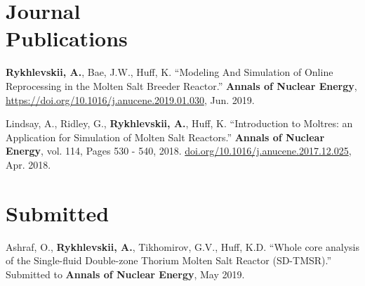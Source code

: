 \documentclass[margin,line]{resume}
\newcommand{\Cyclus}{\textsc{Cyclus}\xspace}%
\begin{document}
\begin{resume}
    \section{\mysidestyle Journal\\Publications}
      \begin{bibenum}
	    
	    
	    \item \textbf{Rykhlevskii, A.}, Bae, J.W., Huff, K. ``Modeling And Simulation of Online Reprocessing in the Molten Salt Breeder Reactor.'' \textbf{Annals of Nuclear Energy}, 
               \url{https://doi.org/10.1016/j.anucene.2019.01.030}, 
               Jun. 2019.
       \item Lindsay, A., Ridley, G., \textbf{Rykhlevskii, A.}, Huff, K. ``Introduction to 
               Moltres: an Application for Simulation of Molten Salt 
               Reactors.''  \textbf{Annals of Nuclear Energy}, vol. 114, Pages 530 - 540, 2018. \url{doi.org/10.1016/j.anucene.2017.12.025}, Apr. 2018.
      \end{bibenum}
\vspace{2mm} %
	\section{\mysidestyle Submitted}
	\begin{bibenum}
		\item Ashraf, O., \textbf{Rykhlevskii, A.}, Tikhomirov, G.V., Huff, K.D. ``Whole core analysis of the Single-fluid Double-zone Thorium Molten Salt Reactor (SD-TMSR).'' 				Submitted to \textbf{Annals of Nuclear Energy}, May 2019.
	\end{bibenum}

\end{resume}
\end{document}
